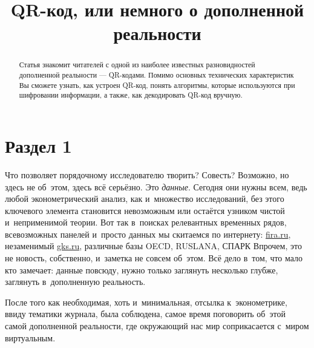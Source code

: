 \documentclass[final,pdftex]{../../template/epsilonj}
\begin{document}
\setcounter{page}{37}
	
	\begin{frontmatter}
		\title{QR-код, или немного о дополненной реальности}
		
		\begin{aug}
			\author{ }%
			
			
			\address{НИУ ВШЭ, Москва.}
		\end{aug}
		
		\begin{abstract}
			Статья знакомит читателей с одной из наиболее известных разновидностей дополненной реальности --- QR-кодами. Помимо основных технических характеристик Вы сможете узнать, как устроен QR-код, понять алгоритмы, которые используются при шифровании информации, а также, как декодировать QR-код вручную. 
		\end{abstract}
		
		\begin{keyword}
		\end{keyword}
		
	\end{frontmatter}
	
	
	\section{Раздел 1}


Что позволяет порядочному исследователю творить? Совесть?  Возможно, но здесь не об~этом, здесь всё серьёзно. Это \textit{данные}. Сегодня они нужны всем, ведь любой эконометрический анализ, как и~множество исследований, без этого ключевого элемента становится невозможным или остаётся узником чистой и~неприменимой теории. Вот так в~поисках релевантных временных рядов, всевозможных панелей и~просто данных мы скитаемся по интернету: \href{http://www.fira.ru}{fira.ru}, незаменимый \href{http://www.gks.ru}{gks.ru}, различные базы OECD, RUSLANA, СПАРК\ldotst{} Впрочем, это не новость, собственно, и~заметка не совсем об~этом. Всё дело в~том, что мало кто замечает: данные повсюду, нужно только заглянуть несколько глубже, заглянуть в~дополненную реальность. 

После того как необходимая, хоть и~минимальная, отсылка к~эконометрике, ввиду тематики журнала, была соблюдена, самое время поговорить об~этой самой дополненной реальности, где окружающий нас мир соприкасается с~миром виртуальным.
\end{document}
